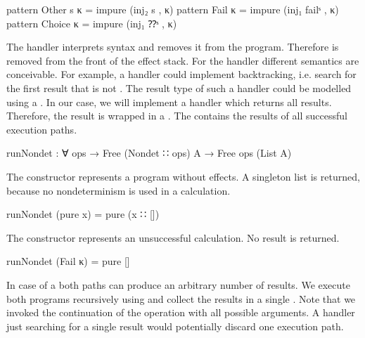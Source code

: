 \begin{code}
pattern Other s κ  = impure (inj₂ s , κ)
pattern Fail κ     = impure (inj₁ failˢ , κ)
pattern Choice κ   = impure (inj₁ ⁇ˢ , κ)
\end{code}
\begin{AgdaAlign}
  The handler interprets  syntax and removes it from the
  program.
  Therefore  is removed from the front of the effect stack.
  For the handler different semantics are conceivable.
  For example, a handler could implement backtracking, i.e. search for the first
  result that is not .
  The result type of such a handler could be modelled using a
  .
  In our case, we will implement a handler which returns all results.
  Therefore, the result is wrapped in a .
  The  contains the results of all successful execution
  paths.
  \begin{code}
runNondet : ∀ {ops} → Free (Nondet ∷ ops) A → Free ops (List A)
  \end{code}
  The  constructor represents a program without
  effects.
  A singleton list is returned, because no nondeterminism is used in a
   calculation.
  \begin{code}
runNondet (pure x)     = pure (x ∷ [])
  \end{code}
  The  constructor represents an unsuccessful
  calculation.
  No result is returned.
  \begin{code}
runNondet (Fail κ)     = pure []
  \end{code}
  In case of a  both paths can produce an
  arbitrary number of results.
  We execute both programs recursively using  and
  collect the results in a single .
  Note that we invoked the continuation of the operation with all possible
  arguments.
  A handler just searching for a single result would potentially discard one
  execution path.


\end{AgdaAlign}
